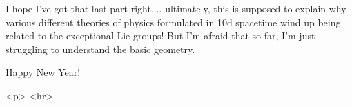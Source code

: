 I hope I've got that last part right.... ultimately, this is supposed to
explain why various different theories of physics formulated in 10d
spacetime wind up being related to the exceptional Lie groups!  But I'm
afraid that so far, I'm just struggling to understand the basic geometry.

Happy New Year!


<p> <hr>




